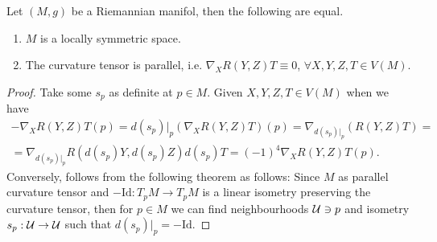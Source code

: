 \documentclass[10pt,a4paper]{article}
\begin{document}
\begin{theorem}
Let $(M,g)$ be a Riemannian manifol, then the following are equal.
\begin{enumerate}
\item $M$ is a locally symmetric space.
\item The curvature tensor is parallel, i.e. $\nabla_X R(Y,Z)T \equiv 0$, $\forall X,Y,Z,T\in V(M)$.
\end{enumerate}
\end{theorem}
\begin{proof}
Take some $s_p$ as definite at $p\in M$. Given $X,Y,Z,T\in V(M)$ when we have 
\begin{multline*}-\nabla_X R(Y,Z)T(p) = d(s_p)\vert_p (\nabla_X R(Y,Z)T)(p) = \nabla_{d(s_p)\vert_p}(R(Y,Z)T) = \\
=\nabla_{d(s_p)\vert_p} R(d(s_p)Y,d(s_p)Z)d(s_p)T = (-1)^4 \nabla_X R(Y,Z)T(p).
\end{multline*}
Conversely, follows from the following theorem as follows: Since $M$ as parallel curvature tensor and $-\text{Id}:T_pM\to T_pM$ is a linear isometry preserving the curvature tensor, then for $p\in M$ we can find neighbourhoods $\mathcal{U}\ni p$ and isometry $s_p:\mathcal{U}\to\mathcal{U}$ such that $d(s_p)\vert_p = -\text{Id}$.
\end{proof}
\end{document}
